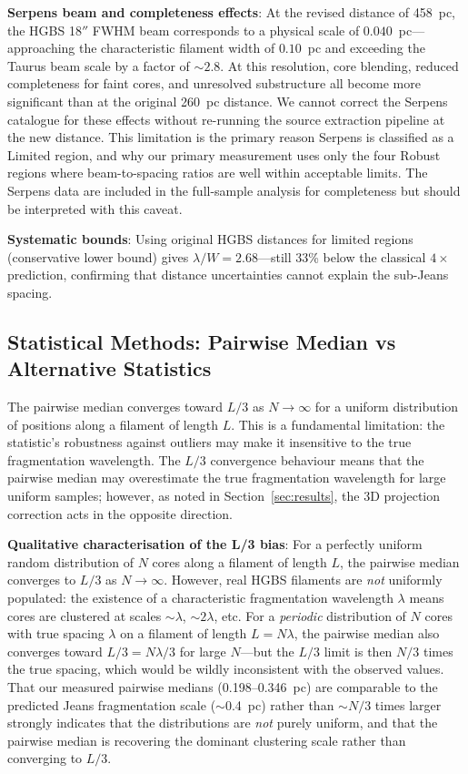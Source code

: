\documentclass[twoside,twocolumn]{mnras}
\begin{document}
\textbf{Serpens beam and completeness effects}: At the revised distance of 458~pc,
the HGBS 18$''$ FWHM beam corresponds to a physical scale of $0.040$~pc---approaching
the characteristic filament width of $0.10$~pc and exceeding the Taurus beam scale by
a factor of $\sim 2.8$. At this resolution, core blending, reduced completeness for
faint cores, and unresolved substructure all become more significant than at the
original 260~pc distance. We cannot correct the Serpens catalogue for these effects
without re-running the source extraction pipeline at the new distance. This limitation
is the primary reason Serpens is classified as a Limited region, and why our primary
measurement uses only the four Robust regions where beam-to-spacing ratios are well
within acceptable limits. The Serpens data are included in the full-sample analysis for
completeness but should be interpreted with this caveat.

\textbf{Systematic bounds}: Using original HGBS distances for limited regions
(conservative lower bound) gives $\lambda/W = 2.68$---still 33\% below the classical
$4\times$ prediction, confirming that distance uncertainties cannot explain the
sub-Jeans spacing.

\subsection{Statistical Methods: Pairwise Median vs Alternative Statistics}
\label{sec:statistics}

The pairwise median converges toward $L/3$ as $N \to \infty$ for a uniform distribution
of positions along a filament of length $L$. This is a fundamental limitation: the
statistic's robustness against outliers may make it insensitive to the true fragmentation
wavelength. The $L/3$ convergence behaviour means that the pairwise median may overestimate the true
fragmentation wavelength for large uniform samples; however, as noted in
Section~\ref{sec:results}, the 3D projection correction acts in the opposite direction.

\textbf{Qualitative characterisation of the L/3 bias}: For a perfectly uniform random
distribution of $N$ cores along a filament of length $L$, the pairwise median converges
to $L/3$ as $N \to \infty$. However, real HGBS filaments are \textit{not} uniformly
populated: the existence of a characteristic fragmentation wavelength $\lambda$ means
cores are clustered at scales $\sim\lambda$, $\sim 2\lambda$, etc. For a \textit{periodic}
distribution of $N$ cores with true spacing $\lambda$ on a filament of length $L = N\lambda$,
the pairwise median also converges toward $L/3 = N\lambda/3$ for large $N$---but the
$L/3$ limit is then $N/3$ times the true spacing, which would be wildly inconsistent
with the observed values. That our measured pairwise medians (0.198--0.346~pc) are
comparable to the predicted Jeans fragmentation scale ($\sim$0.4~pc) rather than
$\sim N/3$ times larger strongly indicates that the distributions are \textit{not}
purely uniform, and that the pairwise median is recovering the dominant clustering scale
rather than converging to $L/3$.
\end{document}
